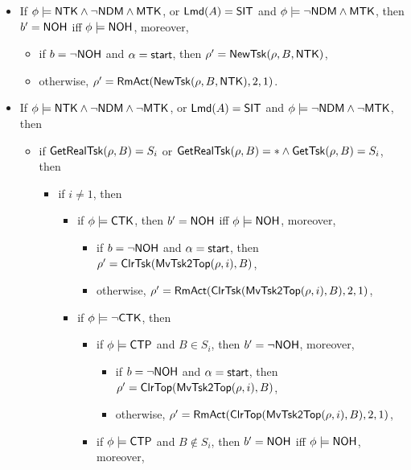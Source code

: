 \begin{itemize}
\item If $\phi \models {\sf NTK} \wedge \neg {\sf NDM}\wedge {\sf MTK}$, or ${\sf Lmd}(A) = {\sf SIT}$ and $\phi\models\neg{\sf NDM}\wedge{\sf MTK}$, then $b' = {\sf NOH}$ iff $\phi \models {\sf NOH}$, moreover, 
	\begin{itemize}
		\item if $b = \neg {\sf NOH}$ and $\alpha = {\mathsf{start} }$, then $\rho' = \mathsf{NewTsk}(\rho, B, {\sf NTK})$, 
		\item otherwise, $\rho' = \mathsf{RmAct}(\mathsf{NewTsk}(\rho, B, {\sf NTK}), 2, 1)$.
	\end{itemize}
%
\item If $\phi \models {\sf NTK} \wedge \neg {\sf NDM} \wedge \neg {\sf MTK}$, or ${\sf Lmd}(A) = {\sf SIT}$ and $\phi\models\neg{\sf NDM}\wedge\neg{\sf MTK}$, then
	\begin{itemize}
        \item if $\mathsf{GetRealTsk}(\rho, B) = S_i$ or $\mathsf{GetRealTsk}(\rho,B) = * \wedge\mathsf{GetTsk}(\rho,B) = S_i$, then
        \begin{itemize}
        \item if $i \neq 1$, then 
			\begin{itemize}
				\item if $\phi \models {\sf CTK}$, then $b' = {\sf NOH}$ iff $\phi \models {\sf NOH}$, moreover, 
                \begin{itemize}
					\item if $b = \neg {\sf NOH}$ and $\alpha = {\mathsf{start} }$, then $\rho'=\mathsf{ClrTsk}(\mathsf{MvTsk2Top}(\rho, i), B)$,
					\item otherwise, $\rho' = \mathsf{RmAct}(\mathsf{ClrTsk}(\mathsf{MvTsk2Top}(\rho, i), B), 2, 1)$, 
                \end{itemize}
				\item if $\phi \models \neg {\sf CTK}$, then
					\begin{itemize}
						\item if $\phi \models{\sf CTP}$ and $B \in S_i$, then $b' = \neg {\sf NOH}$, moreover,
						\begin{itemize}
							\item if $b = \neg {\sf NOH}$ and $\alpha = {\mathsf{start} }$, then $\rho'=\mathsf{ClrTop}(\mathsf{MvTsk2Top}(\rho, i), B)$,
							\item otherwise, $\rho' = \mathsf{RmAct}(\mathsf{ClrTop}(\mathsf{MvTsk2Top}(\rho, i), B), 2, 1)$, 
						\end{itemize}
						\item if $\phi \models{\sf CTP}$ and $B \notin S_i$, then $b' = {\sf NOH}$ iff $\phi \models {\sf NOH}$, moreover, 
						\begin{itemize}

\end{itemize}
\end{itemize}
\end{itemize}
\end{itemize}
\end{itemize}
\end{itemize}
